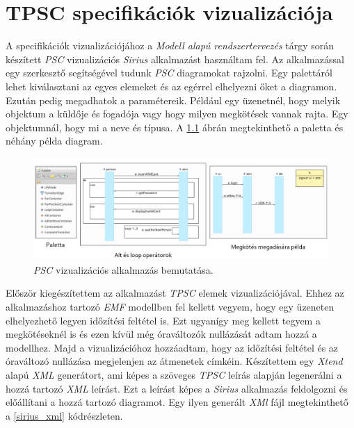 \chapter{TPSC specifikációk vizualizációja}

A specifikációk vizualizációjához a \textit{Modell alapú rendszertervezés} tárgy során készített \textit{PSC} vizualizációs \textit{Sirius} alkalmazást használtam fel.
Az alkalmazással egy szerkesztő segítségével tudunk \textit{PSC} diagramokat rajzolni.
Egy palettáról lehet kiválasztani az egyes elemeket és az egérrel elhelyezni őket a diagramon.
Ezután pedig megadhatok a paramétereik.
Például egy üzenetnél, hogy melyik objektum a küldője és fogadója vagy hogy milyen megkötések vannak rajta.
Egy objektumnál, hogy mi a neve és típusa.
A \ref{sirius_psc} ábrán megtekinthető a paletta és néhány példa diagram.

\begin{figure}[!ht]
    \centering
    \includegraphics[width=150mm, keepaspectratio]{figures/sirius_psc.png}
    \caption{\textit{PSC} vizualizációs alkalmazás bemutatása.}
    \label{sirius_psc}
\end{figure}

Először kiegészítettem az alkalmazást \textit{TPSC} elemek vizualizációjával.
Ehhez az alkalmazáshoz tartozó \textit{EMF} modellben fel kellett vegyem, hogy egy üzeneten elhelyezhető legyen időzítési feltétel is.
Ezt ugyanígy meg kellett tegyem a megkötéseknél is és ezen kívül még óraváltozók nullázását adtam hozzá a modellhez.
Majd a vizualizációhoz hozzáadtam, hogy az időzítési feltétel és az óraváltozó nullázása megjelenjen az átmenetek címkéin.
Készítettem egy \textit{Xtend} alapú \textit{XML} generátort, ami képes a szöveges \textit{TPSC} leírás alapján legenerálni a hozzá tartozó \textit{XML} leírást.
Ezt a leírást képes a \textit{Sirius} alkalmazás feldolgozni és előállítani a hozzá tartozó diagramot.
Egy ilyen generált \textit{XMl} fájl megtekinthető a \ref{sirius_xml} kódrészleten.

